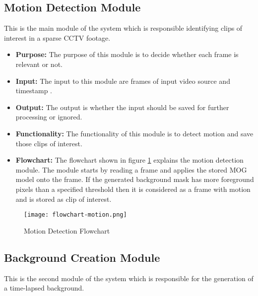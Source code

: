     \subsection{Motion Detection Module}
    This is the main module of the system which is responsible identifying clips of interest in a sparse CCTV footage.

    \begin{itemize}
        \item \textbf{Purpose:} The purpose of this module is to decide whether each frame is relevant or not.
        \item \textbf{Input:} The input to this module are frames of input video source and timestamp .
        \item \textbf{Output:} The output is whether the input should be saved for further processing or ignored.
        \item \textbf{Functionality:} The functionality of this module is to detect motion and save those clips of interest.
        \item \textbf{Flowchart:} The flowchart shown in figure \ref{img:flowchart-motion} explains the motion detection module. The module starts by reading a frame and applies the stored MOG model onto the frame. If the generated background mask has more foreground pixels than a specified threshold then it is considered as a frame with motion and is stored as clip of interest.
    \end{itemize}

    \begin{figure}[H]
        \centering
        \texttt{[image: flowchart-motion.png]}
        \caption{Motion Detection Flowchart}
        \label{img:flowchart-motion}
    \end{figure}


    \subsection{Background Creation Module}
    This is the second module of the system which is responsible for the generation of a time-lapsed background.

